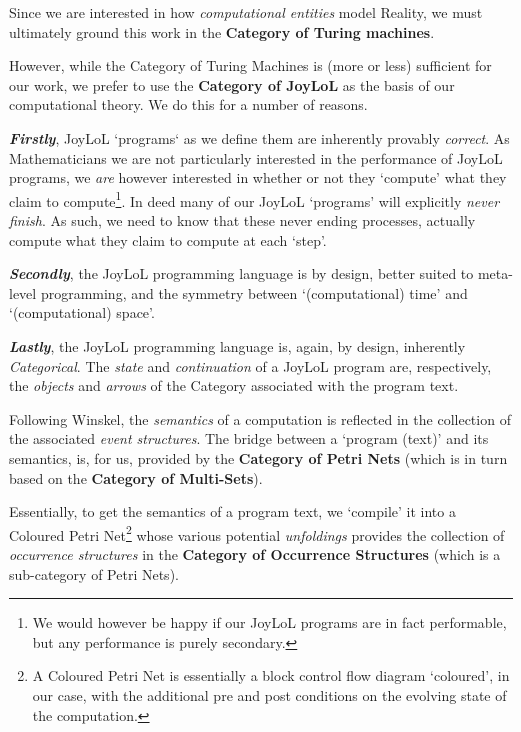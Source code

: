 
Since we are interested in how \emph{computational entities} model Reality, we
must ultimately ground this work in the \textbf{Category of Turing machines}.

However, while the Category of Turing Machines is (more or less) sufficient for
our work, we prefer to use the \textbf{Category of JoyLoL} as the basis of our
computational theory. We do this for a number of reasons.

\textbf{\textit{Firstly}}, JoyLoL `programs` as we define them are inherently
provably \emph{correct}. As Mathematicians we are not particularly interested
in the performance of JoyLoL programs, we \emph{are} however interested in
whether or not they `compute' what they claim to compute\footnote{We would
however be happy if our JoyLoL programs are in fact performable, but any
performance is purely secondary.}. In deed many of our JoyLoL `programs' will
explicitly \emph{never finish}. As such, we need to know that these never ending
processes, actually compute what they claim to compute at each `step'.

\textbf{\textit{Secondly}}, the JoyLoL programming language is by design, better
suited to meta-level programming, and the symmetry between `(computational)
time' and `(computational) space'.

\textbf{\textit{Lastly}}, the JoyLoL programming language is, again, by design,
inherently \emph{Categorical}. The \emph{state} and \emph{continuation} of a
JoyLoL program are, respectively, the \emph{objects} and \emph{arrows} of the
Category associated with the program text.

Following Winskel, the \emph{semantics} of a computation is reflected in the
collection of the associated \emph{event structures}. The bridge between a
`program (text)' and its semantics, is, for us, provided by the \textbf{Category
of Petri Nets} (which is in turn based on the \textbf{Category of Multi-Sets}).

Essentially, to get the semantics of a program text, we `compile' it into a
Coloured Petri Net\footnote{A Coloured Petri Net is essentially a block control
flow diagram `coloured', in our case, with the additional pre and post
conditions on the evolving state of the computation.} whose various potential
\emph{unfoldings} provides the collection of \emph{occurrence structures} in the
\textbf{Category of Occurrence Structures} (which is a sub-category of Petri
Nets).

